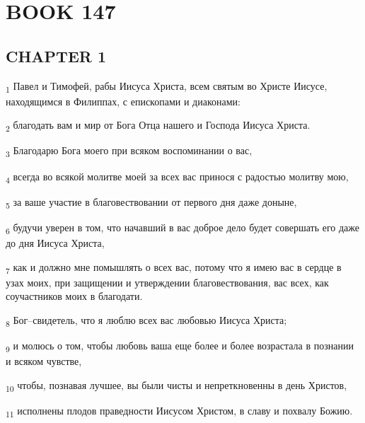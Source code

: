 \section{BOOK 147}
\subsection{CHAPTER 1}
\begin{tcolorbox}
\textsubscript{1} Павел и Тимофей, рабы Иисуса Христа, всем святым во Христе Иисусе, находящимся в Филиппах, с епископами и диаконами:
\end{tcolorbox}
\begin{tcolorbox}
\textsubscript{2} благодать вам и мир от Бога Отца нашего и Господа Иисуса Христа.
\end{tcolorbox}
\begin{tcolorbox}
\textsubscript{3} Благодарю Бога моего при всяком воспоминании о вас,
\end{tcolorbox}
\begin{tcolorbox}
\textsubscript{4} всегда во всякой молитве моей за всех вас принося с радостью молитву мою,
\end{tcolorbox}
\begin{tcolorbox}
\textsubscript{5} за ваше участие в благовествовании от первого дня даже доныне,
\end{tcolorbox}
\begin{tcolorbox}
\textsubscript{6} будучи уверен в том, что начавший в вас доброе дело будет совершать его даже до дня Иисуса Христа,
\end{tcolorbox}
\begin{tcolorbox}
\textsubscript{7} как и должно мне помышлять о всех вас, потому что я имею вас в сердце в узах моих, при защищении и утверждении благовествования, вас всех, как соучастников моих в благодати.
\end{tcolorbox}
\begin{tcolorbox}
\textsubscript{8} Бог--свидетель, что я люблю всех вас любовью Иисуса Христа;
\end{tcolorbox}
\begin{tcolorbox}
\textsubscript{9} и молюсь о том, чтобы любовь ваша еще более и более возрастала в познании и всяком чувстве,
\end{tcolorbox}
\begin{tcolorbox}
\textsubscript{10} чтобы, познавая лучшее, вы были чисты и непреткновенны в день Христов,
\end{tcolorbox}
\begin{tcolorbox}
\textsubscript{11} исполнены плодов праведности Иисусом Христом, в славу и похвалу Божию.
\end{tcolorbox}
